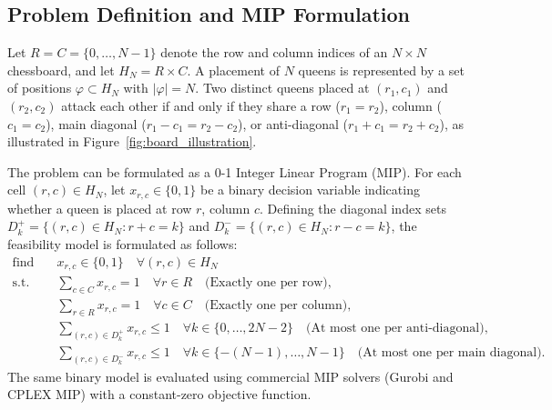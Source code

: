 \documentclass[a4paper,fleqn]{cas-sc}
\begin{document}
\subsection{Problem Definition and MIP Formulation}

Let $R = C = \{0, \ldots, N - 1\}$ denote the row and column indices of an $N \times N$ chessboard, and let $H_N = R \times C$. A placement of $N$ queens is represented by a set of positions $\varphi \subset H_N$ with $|\varphi| = N$. Two distinct queens placed at $(r_1, c_1)$ and $(r_2, c_2)$ attack each other if and only if they share a row ($r_1 = r_2$), column ($c_1 = c_2$), main diagonal ($r_1 - c_1 = r_2 - c_2$), or anti-diagonal ($r_1 + c_1 = r_2 + c_2$), as illustrated in Figure~\ref{fig:board_illustration}.

The problem can be formulated as a 0-1 Integer Linear Program (MIP). For each cell $(r, c) \in H_N$, let $x_{r,c} \in \{0, 1\}$ be a binary decision variable indicating whether a queen is placed at row $r$, column $c$. Defining the diagonal index sets $D^+_k = \{(r, c) \in H_N : r + c = k\}$ and $D^-_k = \{(r, c) \in H_N : r - c = k\}$, the feasibility model is formulated as follows:
\begin{align}
    \text{find} \quad & x_{r,c} \in \{0, 1\} \quad \forall (r, c) \in H_N \label{eq:mip_obj} \\
    \text{s.t.} \quad & \sum_{c \in C} x_{r,c} = 1 \quad \forall r \in R \quad \text{(Exactly one per row)}, \label{eq:mip_row} \\
                      & \sum_{r \in R} x_{r,c} = 1 \quad \forall c \in C \quad \text{(Exactly one per column)}, \label{eq:mip_col} \\
                      & \sum_{(r,c) \in D^+_k} x_{r,c} \le 1 \quad \forall k \in \{0, \ldots, 2N - 2\} \quad \text{(At most one per anti-diagonal)}, \label{eq:mip_anti} \\
                      & \sum_{(r,c) \in D^-_k} x_{r,c} \le 1 \quad \forall k \in \{-(N - 1), \ldots, N - 1\} \quad \text{(At most one per main diagonal)}. \label{eq:mip_main}
\end{align}
The same binary model is evaluated using commercial MIP solvers (Gurobi and CPLEX MIP) with a constant-zero objective function.
\end{document}
